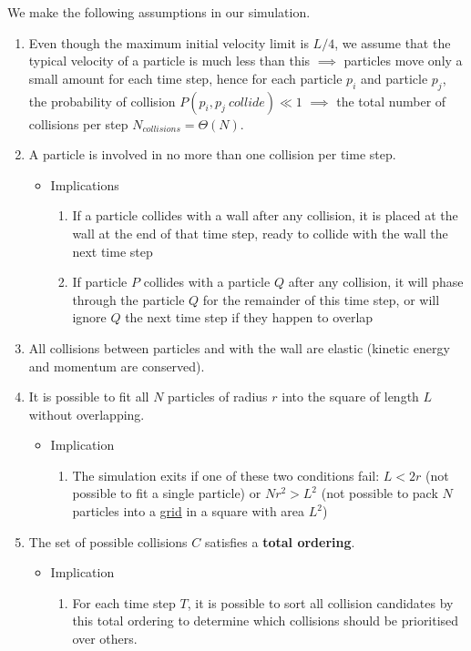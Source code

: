 \documentclass[12pt]{article}
\begin{document}
We make the following assumptions in our simulation.

\begin{enumerate}
	\item Even though the maximum initial velocity limit is $L/4$, we assume that the typical velocity of a particle is much less than this $\implies$ particles move only a small amount for each time step, hence for each particle $p_i$ and particle $p_j$, the probability of collision $P(p_i, p_j\ collide) \ll 1$ $\implies$ the total number of collisions per step $N_{collisions} = \Theta (N)$.
	\item A particle is involved in no more than one collision per time step.
	\begin{itemize}
		\item Implications
		\begin{enumerate}
			\item If a particle collides with a wall after any collision, it is placed at the wall at the end of that time step, ready to collide with the wall the next time step
			\item If particle $P$ collides with a particle $Q$ after any collision, it will phase through the particle $Q$ for the remainder of this time step, or will ignore $Q$ the next time step if they happen to overlap
		\end{enumerate}
	\end{itemize}
	\item All collisions between particles and with the wall are elastic (kinetic energy and momentum are conserved). 
	\item It is possible to fit all $N$ particles of radius $r$ into the square of length $L$ without overlapping.
	\begin{itemize}
		\item Implication
		\begin{enumerate}
			\item The simulation exits if one of these two conditions fail: $L < 2r$ (not possible to fit a single particle) or $Nr^2 > L^2$ (not possible to pack $N$ particles into a \ul{grid} in a square with area $L^2$)
		\end{enumerate}
	\end{itemize}
	\item The set of possible collisions $C$ satisfies a \textbf{total ordering}.
	\begin{itemize}
		\item Implication
		\begin{enumerate}
			\item For each time step $T$, it is possible to sort all collision candidates by this total ordering to determine which collisions should be prioritised over others.
		\end{enumerate}
	\end{itemize}
\end{enumerate}
\end{document}
